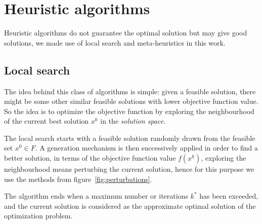 \section{Heuristic algorithms}\label{sc:algs}

Heuristic algorithms do not guarantee the optimal solution but may give good solutions, we made use of local search and meta-heuristics in this work.

\subsection{Local search}\label{subsc:local-search}

The idea behind this class of algorithms is simple: given a feasible solution, there might be some other similar feasible solutions with lower objective function value. So the idea is to optimize the objective function by exploring the neighbourhood of the current best solution $x^k$ in the \emph{solution space}.

The local search starts with a feasible solution randomly drawn from the feasible set $x^0\in F$. A generation mechanism is then successively applied in order to find a better solution, in terms of the objective function value $f(x^k)$, exploring the neighbourhood means perturbing the current solution, hence for this purpose we use the methods from figure~\vref{fig:perturbations}.

The algorithm ends when a maximum number or iterations $k^\ast$ has been exceeded, and the current solution is considered as the approximate optimal solution of the optimization problem.




